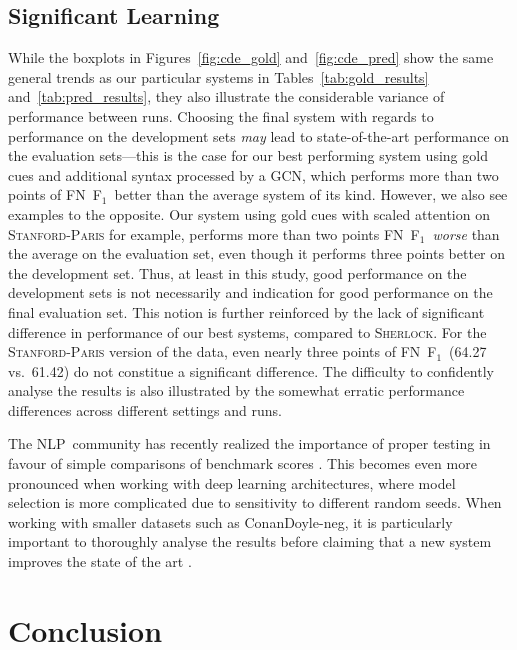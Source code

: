 \documentclass[11pt,a4paper]{article}
\theoremstyle{plain}
\def\fscore{F$_1$}
\begin{document}
\subsection{Significant Learning}

While the boxplots in Figures~\ref{fig:cde_gold} and~\ref{fig:cde_pred} show
the same general trends as our particular systems in
Tables~\ref{tab:gold_results} and~\ref{tab:pred_results}, they also illustrate
the considerable variance of performance between runs.
Choosing the final system with regards to performance on the development sets
\emph{may} lead to state-of-the-art performance on the evaluation sets---this is the case for our best performing system using gold cues and
additional syntax processed by a GCN, which performs more than two points of
FN~\fscore\ better than the average system of its kind.
However, we also see examples to the opposite.
Our system using gold cues with scaled attention on \textsc{Stanford-Paris} for
example, performs more than two points FN~\fscore\ \emph{worse} than the average on
the evaluation set, even though it performs three points better on the
development set.
Thus, at least in this study, good performance on the development sets is not necessarily and indication for
good performance on the final evaluation set.
This notion is further
reinforced by the lack of significant difference in performance of our best
systems, compared to \textsc{Sherlock}.
For the \textsc{Stanford-Paris} version of the data, even nearly three points of FN~\fscore\ (64.27 vs.\ 61.42) do not constitue a
significant difference.
The difficulty to confidently analyse the results is also illustrated by the
somewhat erratic performance differences across different settings and runs.

The NLP~community has recently realized the importance of proper testing in
favour of simple comparisons of benchmark scores \citep{gorman2019we}.
This becomes even more pronounced when working with deep learning architectures, where model selection is more complicated \citep{moss2019fiesta} due to sensitivity to different random seeds.
When working with smaller datasets such as ConanDoyle-neg, it is particularly
important to thoroughly analyse the results before claiming that a new system improves the state of the art \citep{dror2017replicability}.

\section{Conclusion}
\label{sec:conclusion}
\end{document}
